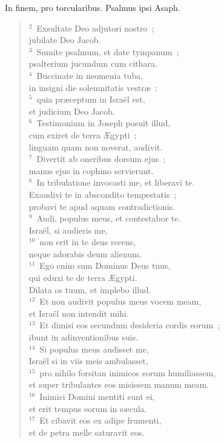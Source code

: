 \lettrine[lines=3,image=true,loversize=0.05,lraise=-0.03]{I}{}n finem, pro torcularibus. Psalmus ipsi Asaph.
\begin{flushleft}\begin{verse}\vspace{6pt}${}^{2}$~Exsultate Deo adjutori nostro~;\\ jubilate Deo Jacob.\\
${}^{3}$~Sumite psalmum, et date tympanum~;\\ psalterium jucundum cum cithara.\\
${}^{4}$~Buccinate in neomenia tuba,\\ in insigni die solemnitatis vestr\ae~:\\
${}^{5}$~quia pr\ae ceptum in Isra\"el est,\\ et judicium Deo Jacob.\\
${}^{6}$~Testimonium in Joseph posuit illud,\\ cum exiret de terra \AE gypti~;\\ linguam quam non noverat, audivit.\\
${}^{7}$~Divertit ab oneribus dorsum ejus~;\\ manus ejus in cophino servierunt.\\
${}^{8}$~In tribulatione invocasti me, et liberavi te.\\ Exaudivi te in abscondito tempestatis~;\\ probavi te apud aquam contradictionis.\\
${}^{9}$~Audi, populus meus, et contestabor te.\\ Isra\"el, si audieris me,\\
${}^{10}$~non erit in te deus recens,\\ neque adorabis deum alienum.\\
${}^{11}$~Ego enim sum Dominus Deus tuus,\\ qui eduxi te de terra \AE gypti.\\ Dilata os tuum, et implebo illud.\\
${}^{12}$~Et non audivit populus meus vocem meam,\\ et Isra\"el non intendit mihi.\\
${}^{13}$~Et dimisi eos secundum desideria cordis eorum~;\\ ibunt in adinventionibus suis.\\
${}^{14}$~Si populus meus audisset me,\\ Isra\"el si in viis meis ambulasset,\\
${}^{15}$~pro nihilo forsitan inimicos eorum humiliassem,\\ et super tribulantes eos misissem manum meam.\\
${}^{16}$~Inimici Domini mentiti sunt ei,\\ et erit tempus eorum in s\ae cula.\\
${}^{17}$~Et cibavit eos ex adipe frumenti,\\ et de petra melle saturavit eos.\end{verse}\end{flushleft}



